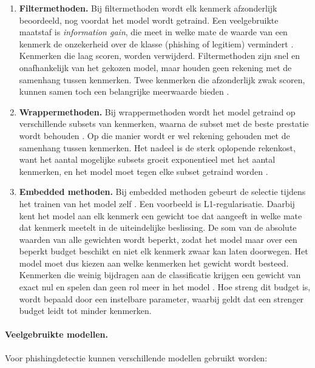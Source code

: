 \begin{enumerate}
    \item \textbf{Filtermethoden.} Bij filtermethoden wordt elk kenmerk afzonderlijk beoordeeld, nog voordat het model wordt getraind. Een veelgebruikte maatstaf is \emph{information gain}, die meet in welke mate de waarde van een kenmerk de onzekerheid over de klasse (phishing of legitiem) vermindert \autocite{Forman2003}. Kenmerken die laag scoren, worden verwijderd. Filtermethoden zijn snel en onafhankelijk van het gekozen model, maar houden geen rekening met de samenhang tussen kenmerken. Twee kenmerken die afzonderlijk zwak scoren, kunnen samen toch een belangrijke meerwaarde bieden \autocite{Guyon2003}.
    \item \textbf{Wrappermethoden.} Bij wrappermethoden wordt het model getraind op verschillende subsets van kenmerken, waarna de subset met de beste prestatie wordt behouden \autocite{Kohavi1997}. Op die manier wordt er wel rekening gehouden met de samenhang tussen kenmerken. Het nadeel is de sterk oplopende rekenkost, want het aantal mogelijke subsets groeit exponentieel met het aantal kenmerken, en het model moet tegen elke subset getraind worden \autocite{Kohavi1997}.
    \item \textbf{Embedded methoden.} Bij embedded methoden gebeurt de selectie tijdens het trainen van het model zelf \autocite{Guyon2003}. Een voorbeeld is L1-regula\-risatie. Daarbij kent het model aan elk kenmerk een gewicht toe dat aangeeft in welke mate dat kenmerk meetelt in de uiteindelijke beslissing. De som van de absolute waarden van alle gewichten wordt beperkt, zodat het model maar over een beperkt budget beschikt en niet elk kenmerk zwaar kan laten doorwegen. Het model moet dus kiezen aan welke kenmerken het gewicht wordt besteed. Kenmerken die weinig bijdragen aan de classificatie krijgen een gewicht van exact nul en spelen dan geen rol meer in het model \autocite{Fatih2024}. Hoe streng dit budget is, wordt bepaald door een instelbare parameter, waarbij geldt dat een strenger budget leidt tot minder kenmerken.
\end{enumerate}

\paragraph{Veelgebruikte modellen.}
Voor phishingdetectie kunnen verschillende modellen gebruikt worden:

